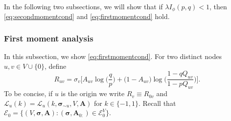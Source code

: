 \documentclass[letterpaper,11pt]{article}
\theoremstyle{definition}
\def\bA{\bm{A}}
\newcommand{\bsigma}{\bm{\sigma}}
\def\cE{\mathcal{E}}
\def\cL{\mathcal{L}}
\numberwithin{equation}{section}
\newcommand{\la}{\lambda}
\theoremstyle{definition}
\def\bA{\bm{A}}
\newcommand{\bsigma}{\bm{\sigma}}
\def\cE{\mathcal{E}}
\def\cL{\mathcal{L}}
\numberwithin{equation}{section}
\newcommand{\la}{\lambda}
\theoremstyle{thmstyletwo}%
\begin{document}
In the following two subsections, we will show that if $\la I_\phi(p,q) <1$, then \eqref{eq:secondmomentcond} and \eqref{eq:firstmomentcond} hold.


\subsubsection{First moment analysis}
\label{sec:first_moment}
In this subsection, we show \eqref{eq:firstmomentcond}. For two distinct nodes $u,v\in V\cup\{0\}$, define
\begin{equation}
R_{uv} = \sigma_v\bigg[A_{uv}\log \Big(\frac{q}{p}\Big)+ \big( 1-A_{uv} \big)\log\bigg(\frac{1-qQ_{uv}}{1-pQ_{uv}}\bigg)\bigg].
\label{eq:ruv}
\end{equation}
To be concise, if $u$ is the origin we write $R_v \equiv R_{0v} $ and $\cL_u(k) = \cL_u(k,\bsigma_{\sim u},V,\bA)$ for $k\in \{-1,1\}$. Recall that $\cE_0 = \{(V,\bsigma,\bA): (\bsigma,\bA_{0:})\in \cE_0^V\}$.
\end{document}
